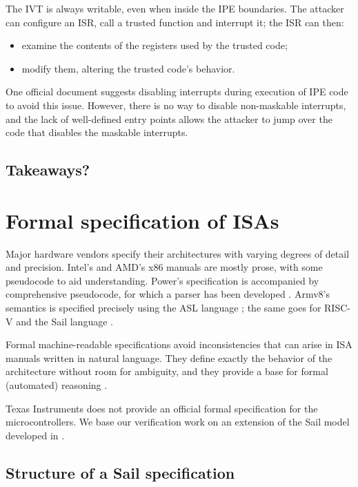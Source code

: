 The IVT is always writable, even when inside the IPE boundaries. The attacker can configure an ISR, call a trusted function and interrupt it; the ISR can then:
\begin{itemize}
\item examine the contents of the registers used by the trusted code;
\item modify them, altering the trusted code's behavior.
\end{itemize}

One official document \cite{slaa685} suggests disabling interrupts during execution of IPE code to avoid this issue. However, there is no way to disable non-maskable interrupts, and the lack of well-defined entry points allows the attacker to jump over the code that disables the maskable interrupts.

\subsection{Takeaways?}


\section{Formal specification of ISAs}

Major hardware vendors specify their architectures with varying degrees of detail and precision. Intel's \cite{Intel2025} and AMD's \cite{AMD2024} x86 manuals are mostly prose, with some pseudocode to aid understanding. Power's specification \cite{OPF2024} is accompanied by comprehensive pseudocode, for which a parser has been developed \cite{libreSOC}. Armv8's semantics is specified precisely using the ASL language \cite{Arm2020}\cite{Reid2016}; the same goes for RISC-V and the Sail language \cite{RVSail}.

Formal machine-readable specifications avoid inconsistencies that can arise in ISA manuals written in natural language. They define exactly the behavior of the architecture without room for ambiguity, and they provide a base for formal (automated) reasoning \cite{Armstrong2018}.

Texas Instruments does not provide an official formal specification for the \msp microcontrollers. We base our verification work on an extension of the \msp Sail model developed in \todocite{}.

\subsection{Structure of a Sail specification}
\label{sec:sail-structure}


